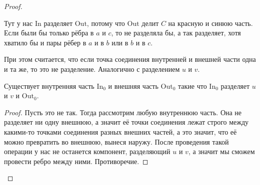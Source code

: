 \documentclass{article}
\begin{document}
\begin{proof}
\begin{example}
\begin{figure}[H]
            \end{figure}\noindent
            Тут у нас $\mathrm{In}$ разделяет $\mathrm{Out}$, потому что $\mathrm{Out}$ делит $C$ на красную и синюю часть. Если были бы только рёбра в $a$ и $c$, то не разделяла бы, а так разделяет, хотя хватило бы и пары рёбер в $a$ и в $b$ или в $b$ и в $c$.
        \end{example}
        \begin{remark}
            При этом считается, что если точка соединения внутренней и внешней части одна и та же, то это не разделение. Аналогично с разделением $u$ и $v$.
        \end{remark}
        \begin{lemma}
            Существует внутренняя часть $\mathrm{In}_0$ и внешняя часть $\mathrm{Out}_0$ такие что $\mathrm{In}_0$ разделяет $u$ и $v$ и $\mathrm{Out}_0$.
        \end{lemma}
        \begin{proof}
            Пусть это не так. Тогда рассмотрим любую внутреннюю часть. Она не разделяет ни одну внешнюю, а значит её точки соединения лежат строго между какими-то точками соединения разных внешних частей, а это значит, что её можно превратить во внешнюю, вынеся наружу. После проведения такой операции у нас не останется компонент, разделяющий $u$ и $v$, а значит мы сможем провести ребро между ними. Противоречие.

\end{proof}
\end{proof}
\end{document}
